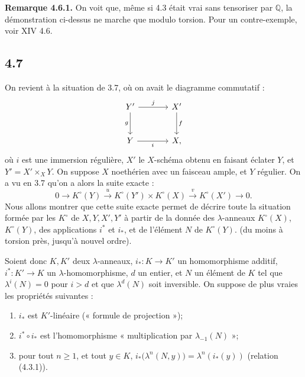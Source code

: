 \textbf{Remarque 4.6.1.} On voit que, même si 4.3 était vrai sans tensoriser par \(\mathbb Q\), la démonstration ci-dessus ne marche que modulo torsion. Pour un contre-exemple, voir XIV 4.6.

\subsection*{4.7}

On
revient à la situation de 3.7, où on avait le diagramme commutatif :
\[
\begin{tikzcd}[column sep=large,row sep=large]
Y' \arrow[r,"j"] \arrow[d,"g"'] & X' \arrow[d,"f"]\\
Y \arrow[r,"i"'] & X,
\end{tikzcd}
\]
où \(i\) est une immersion régulière, \(X'\) le \(X\)-schéma obtenu en faisant éclater \(Y\), et \(Y'=X'\times_XY\). On suppose \(X\) noethérien avec un faisceau ample, et \(Y\) régulier. On a vu en 3.7 qu'on a alors la suite exacte :
\[
0\longrightarrow K^\circ(Y)\xrightarrow{u}
K^\circ(Y')\times K^\circ(X)\xrightarrow{v}
K^\circ(X')\longrightarrow0.
\]
Nous allons montrer que cette suite exacte permet de décrire toute la situation formée par les \(K^\circ\) de \(X,Y,X',Y'\) à partir de la donnée des \(\lambda\)-anneaux \(K^\circ(X)\), \(K^\circ(Y)\), des applications \(i^*\) et \(i_*\), et de l'élément \(N\) de \(K^\circ(Y)\). (du moins à torsion près, jusqu'à nouvel ordre).

Soient donc \(K,K'\) deux \(\lambda\)-anneaux, \(i_*:K\to K'\) un homomorphisme additif, \(i^*:K'\to K\) un \(\lambda\)-homomorphisme, \(d\) un entier, et \(N\) un élément de \(K\) tel que \(\lambda^i(N)=0\) pour \(i>d\) et que \(\lambda^d(N)\) soit inversible. On suppose de plus vraies les propriétés suivantes :
\begin{enumerate}[label=\roman*)]
\item \(i_*\) est \(K'\)-linéaire (« formule de projection »);
\item \(i^*\circ i_*\) est l'homomorphisme « multiplication par \(\lambda_{-1}(N)\) »;
\item pour tout \(n\ge1\), et tout \(y\in K\), \(i_*\bigl(\lambda^n(N,y)\bigr)=\lambda^n(i_*(y))\) (relation (4.3.1)).
\end{enumerate}

